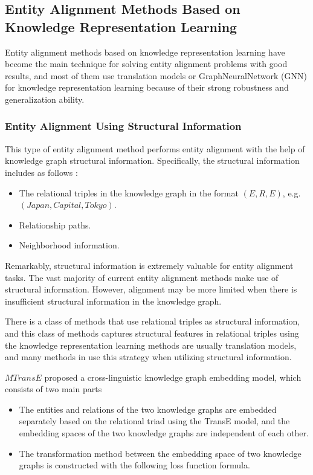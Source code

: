 \documentclass[sigconf]{acmart}
\begin{document}
{\subsection{Entity Alignment Methods Based on Knowledge Representation Learning}

Entity alignment methods based on knowledge representation learning have become the main technique for solving entity alignment problems with good results, and most of them use translation models or GraphNeuralNetwork (GNN) for knowledge representation learning because of their strong robustness and generalization ability.

\subsubsection{Entity Alignment Using Structural Information}

This type of entity alignment method performs entity alignment with the help of knowledge graph structural information. Specifically, the structural information includes as follows :
\begin{itemize}
    \item The relational triples in the knowledge graph in the format $(E,R,E)$, e.g. $(Japan, Capital, Tokyo)$.
    \item Relationship paths.
    \item Neighborhood information.
\end{itemize}

Remarkably, structural information is extremely valuable for entity alignment tasks. The vast majority of current entity alignment methods make use of structural information. However, alignment may be more limited when there is insufficient structural information in the knowledge graph.

There is a class of methods that use relational triples as structural information, and this class of methods captures structural features in relational triples using the knowledge representation learning methods are usually translation models, and many methods in use this strategy when utilizing structural information.

$MTransE$ \cite{chen2016multilingual} proposed a cross-linguistic knowledge graph embedding model, which consists of two main parts

\begin{itemize}
    \item The entities and relations of the two knowledge graphs are embedded separately based on the relational triad using the TransE model, and the embedding spaces of the two knowledge graphs are independent of each other.
    \item The transformation method between the embedding space of two knowledge graphs is constructed with the following loss function formula.
\end{itemize}

}
\end{document}
